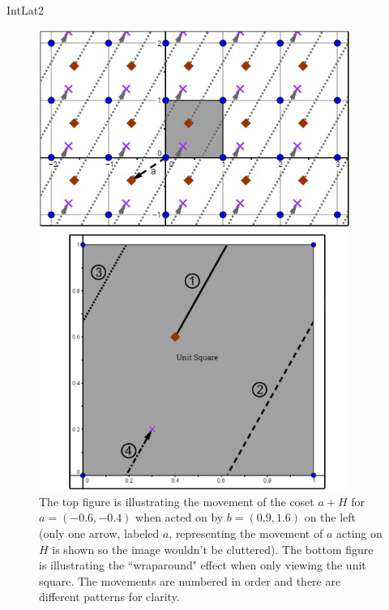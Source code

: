 \begin{example}{IntLat2}
\begin{figure}[htpb]
\begin{center}
\includegraphics[width=4.0in]{images/Lattice2.png}
\caption{The top figure is illustrating the movement of the coset $a+H$ for $a=(-0.6,-0.4)$ when acted on by $b=(0.9,1.6)$ on the left (only one arrow, labeled $a$, representing the movement of $a$ acting on $H$ is shown so the image wouldn't be cluttered). The bottom figure is illustrating the ``wraparound" effect when only viewing the unit square. The movements are numbered in order and there are different patterns for clarity.}
\label{fig:Lattice2}
\end{center}
\end{figure}

\end{example}

